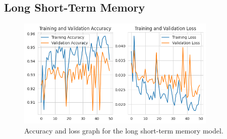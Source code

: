 \subsection{Long Short-Term Memory}\label{subsec:long-short-term-memory}

\begin{figure}[ht]
    \centering
    \includegraphics[width=0.85\textwidth]{./img/lstm/accuracy-loss-graph}
    \caption{Accuracy and loss graph for the long short-term memory model.}
    \label{fig:lstm-accuracy-loss-graph}
\end{figure}

